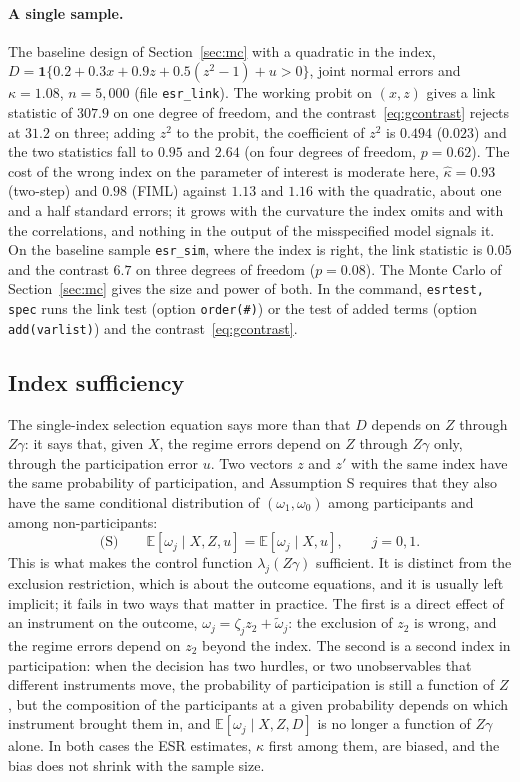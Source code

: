 \documentclass[11pt,a4paper]{article}
\theoremstyle{plain}
\theoremstyle{definition}
\theoremstyle{remark}
\newcommand{\E}{\mathbb{E}}
\newcommand{\1}{\mathbf{1}}
\newcommand{\cmd}[1]{\texttt{#1}}
\begin{document}
\paragraph{A single sample.}
The baseline design of Section~\ref{sec:mc} with a quadratic in the
index, $D=\1\{0.2+0.3x+0.9z+0.5(z^2-1)+u>0\}$, joint normal errors and
$\kappa=1.08$, $n=5{,}000$ (file \cmd{esr\_link}). The working probit on
$(x,z)$ gives a link statistic of $307.9$ on one degree of freedom, and
the contrast~\eqref{eq:gcontrast} rejects at $31.2$ on three; adding
$z^2$ to the probit, the coefficient of $z^2$ is $0.494$ ($0.023$) and
the two statistics fall to $0.95$ and $2.64$ (on four degrees of
freedom, $p=0.62$). The cost of the wrong index on the parameter of
interest is moderate here, $\hat\kappa=0.93$ (two-step) and $0.98$
(FIML) against $1.13$ and $1.16$ with the quadratic, about one and a
half standard errors; it grows with the curvature the index omits and
with the correlations, and nothing in the output of the misspecified
model signals it. On the baseline sample \cmd{esr\_sim}, where the index
is right, the link statistic is $0.05$ and the contrast $6.7$ on three
degrees of freedom ($p=0.08$). The Monte Carlo of Section~\ref{sec:mc}
gives the size and power of both. In the command, \cmd{esrtest, spec}
runs the link test (option \cmd{order(\#)}) or the test of added terms
(option \cmd{add(varlist)}) and the contrast~\eqref{eq:gcontrast}.

\subsection{Index sufficiency}\label{sec:tests:suff}

The single-index selection equation says more than that $D$ depends on $Z$
through $Z\gamma$: it says that, given $X$, the regime errors depend on $Z$
through $Z\gamma$ only, through the participation error $u$. Two vectors
$z$ and $z'$ with the same index have the same probability of participation,
and Assumption S requires that they also have the same conditional
distribution of $(\omega_1,\omega_0)$ among participants and among
non-participants:
\begin{equation}\label{eq:S}
\text{(S)}\qquad \E[\omega_j\mid X,Z,u]=\E[\omega_j\mid X,u],\qquad j=0,1.
\end{equation}
This is what makes the control function $\lambda_j(Z\gamma)$ sufficient.
It is distinct from the exclusion restriction, which is about the
outcome equations, and it is usually left implicit; it fails in two ways
that matter in practice. The first is a direct effect of an instrument on
the outcome, $\omega_j=\zeta_j z_2+\tilde\omega_j$: the exclusion of $z_2$
is wrong, and the regime errors depend on $z_2$ beyond the index. The
second is a second index in participation: when the decision has two
hurdles, or two unobservables that different instruments move, the
probability of participation is still a function of $Z$, but the
composition of the participants at a given probability depends on which
instrument brought them in, and $\E[\omega_j\mid X,Z,D]$ is no longer a
function of $Z\gamma$ alone. In both cases the ESR estimates, $\kappa$
first among them, are biased, and the bias does not shrink with the sample
size.
\end{document}

